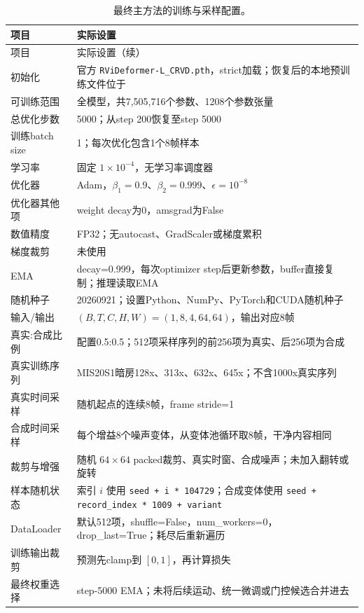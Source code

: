 \documentclass[11pt,a4paper,UTF8,fontset=fandol]{ctexart}
\begin{document}
\begin{longtable}{P{0.27\textwidth}P{0.65\textwidth}}
\caption{最终主方法的训练与采样配置。}\label{tab:training_config}\\
\toprule 项目 & 实际设置 \\ \midrule
\endfirsthead
\toprule 项目 & 实际设置（续） \\ \midrule
\endhead
\bottomrule\endfoot
初始化 & 官方 \texttt{RViDeformer-L\_CRVD.pth}，strict加载；恢复后的本地预训练文件位于  \\
可训练范围 & 全模型，共7,505,716个参数、1208个参数张量 \\
总优化步数 & 5000；从step 200恢复至step 5000 \\
训练batch size & 1；每次优化包含1个8帧样本 \\
学习率 & 固定 $1\times10^{-4}$，无学习率调度器 \\
优化器 & Adam，$\beta_1=0.9$、$\beta_2=0.999$、$\epsilon=10^{-8}$ \\
优化器其他项 & weight decay为0，amsgrad为False \\
数值精度 & FP32；无autocast、GradScaler或梯度累积 \\
梯度裁剪 & 未使用 \\
EMA & decay=0.999，每次optimizer step后更新参数，buffer直接复制；推理读取EMA \\
随机种子 & 20260921；设置Python、NumPy、PyTorch和CUDA随机种子 \\
输入/输出 & $(B,T,C,H,W)=(1,8,4,64,64)$，输出对应8帧 \\
真实:合成比例 & 配置0.5:0.5；512项采样序列的前256项为真实、后256项为合成 \\
真实训练序列 & MIS20S1暗房128x、313x、632x、645x；不含1000x真实序列 \\
真实时间采样 & 随机起点的连续8帧，frame stride=1 \\
合成时间采样 & 每个增益8个噪声变体，从变体池循环取8帧，干净内容相同 \\
裁剪与增强 & 随机 $64\times64$ packed裁剪、真实时窗、合成噪声；未加入翻转或旋转 \\
样本随机状态 & 索引 $i$ 使用 \texttt{seed + i * 104729}；合成变体使用 \texttt{seed + record\_index * 1009 + variant} \\
DataLoader & 默认512项，shuffle=False，num\_workers=0，drop\_last=True；耗尽后重新遍历 \\
训练输出裁剪 & 预测先clamp到 $[0,1]$，再计算损失 \\
最终权重选择 & step-5000 EMA；未将后续运动、统一微调或门控候选合并进去 \\
\end{longtable}
\end{document}
